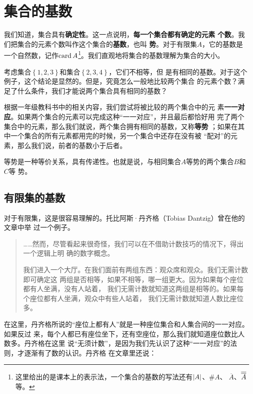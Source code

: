 \section{集合的基数}

我们知道，集合具有\textbf{确定性}。这一点说明，\textbf{每一个集合都有确定的元素
个数}。我们把集合的元素个数叫作这个集合的\textbf{基数}，也叫
\textbf{势}。对于有限集$A$，它的基数是一个自然数，记作$\operatorname{card}{A}
$\footnote{这里给出的是课本上的表示法，一个集合的基数的写法还有$\left|{A}\right|$、$\# A$、
$\overline{A}$、$\overline{\overline{{A}}}$等。}。我们直观地将集合的基数理解为集合的大小。

考虑集合$\left\{ 1,2,3 \right\} $和集合$\left\{ 2,3,4 \right\} $，它们不相等，但
是有相同的基数。对于这个例子，这个结论是显然的。但是，究竟怎么一般地比较两个集合
的元素个数？满足了什么条件，我们才能说两个集合具有相同的基数？

根据一年级教科书中的相关内容\cite{pep_math_1A}，我们尝试将被比较的两个集合中的元
素\textbf{一一对应}。如果两个集合的元素可以完成这种“一一对应”，并且最后都恰好用
完了两个集合中的元素，那么我们就说，两个集合拥有相同的基数，又称\textbf{等势}
；如果在其中一个集合的所有元素都用完的时候，另一个集合中还存在没有被
“配对”的元素，那么我们说，前者的基数小于后者。

等势是一种等价关系，具有传递性。也就是说，与相同集合$A$等势的两个集合$B$和$C$等
势。

\subsection{有限集的基数}

对于有限集，这是很容易理解的。托比阿斯·丹齐格（Tobias Dantzig）曾在他的文章中举
过一个例子。\cite{dantzig2007number}

\begin{quotation}
    ……然而，尽管看起来很奇怪，我们可以在不借助计数技巧的情况下，得出一个逻辑上明
    确的数字概念。

    我们进入一个大厅。在我们面前有两组东西：观众席和观众。我们无需计数即可确定这
    两组是否相等，如果不相等，哪一组更大。因为如果每个座位都有人坐满，没有人站着，
    我们无需计数就知道这两组是相等的。如果每个座位都有人坐满，观众中有些人站着，
    我们无需计数就知道人数比座位多。
\end{quotation}

在这里，丹齐格所说的“座位上都有人”就是一种座位集合和人集合间的一一对应。如果反过
来，每个人都已有座位坐下，还有空座位，那么我们就知道座位数比人数多。丹齐格在这里
说“无须计数”，是因为我们先认识了这种“一一对应”的法则，才逐渐有了数的认识。丹齐格
在文章里还说：

